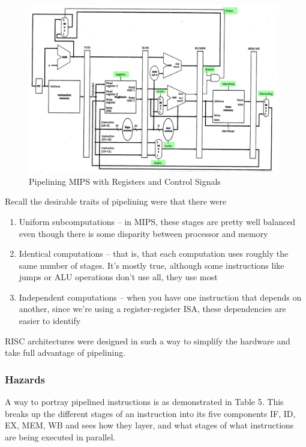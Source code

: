 \documentclass{article}
\begin{document}
\begin{figure}[ht!]
\centering
\includegraphics[width=110mm]{img/PipeliningMIPSRegs.png}
\caption{Pipelining MIPS with Registers and Control Signals}
\end{figure}

Recall the desirable traits of pipelining were that there were

\begin{enumerate}
\item Uniform subcomputations -- in MIPS, these stages are pretty well balanced even though there is some disparity between processor and memory

\item Identical computations -- that is, that each computation uses roughly the same number of stages. It's mostly true, although some instructions like jumps or ALU operations don't use all, they use most

\item Independent computations -- when you have one instruction that depends on another, since we're using a register-register ISA, these dependencies are easier to identify

\end{enumerate}

RISC  architectures were designed in such a way to simplify the hardware and take full advantage of pipelining.

\subsubsection{Hazards}

A way to portray pipelined instructions is as demonstrated in Table 5. This breaks up the different stages of an instruction into its five components IF, ID, EX, MEM, WB and sees how they layer, and what stages of what instructions are being executed in parallel. 
\end{document}
